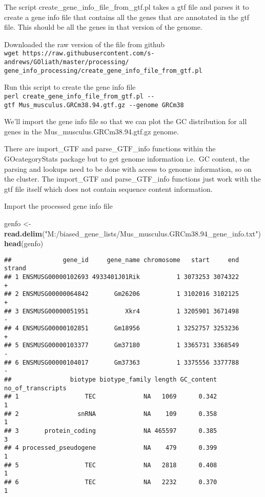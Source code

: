 \documentclass[]{article}
\newenvironment{Shaded}{\begin{snugshade}}{\end{snugshade}}
\newcommand{\KeywordTok}[1]{\textcolor[rgb]{0.13,0.29,0.53}{\textbf{#1}}}
\newcommand{\NormalTok}[1]{#1}
\newcommand{\StringTok}[1]{\textcolor[rgb]{0.31,0.60,0.02}{#1}}
\begin{document}
The script create\_gene\_info\_file\_from\_gtf.pl takes a gtf file and
parses it to create a gene info file that contains all the genes that
are annotated in the gtf file. This should be all the genes in that
version of the genome.

Downloaded the raw version of the file from github
\texttt{wget\ https://raw.githubusercontent.com/s-andrews/GOliath/master/processing/}
\texttt{gene\_info\_processing/create\_gene\_info\_file\_from\_gtf.pl}

Run this script to create the gene info file
\texttt{perl\ create\_gene\_info\_file\_from\_gtf.pl\ -\/-gtf\ Mus\_musculus.GRCm38.94.gtf.gz\ -\/-genome\ GRCm38}

We'll import the gene info file so that we can plot the GC distribution
for all genes in the Mus\_musculus.GRCm38.94.gtf.gz genome.

There are import\_GTF and parse\_GTF\_info functions within the
GOcategoryStats package but to get genome information i.e.~GC content,
the parsing and lookups need to be done with access to genome
information, so on the cluster. The import\_GTF and parse\_GTF\_info
functions just work with the gtf file itself which does not contain
sequence content information.

Import the processed gene info file

\begin{Shaded}
\begin{Highlighting}[]
\NormalTok{genfo <-}\StringTok{ }\KeywordTok{read.delim}\NormalTok{(}\StringTok{"M:/biased_gene_lists/Mus_musculus.GRCm38.94_gene_info.txt"}\NormalTok{)}
\KeywordTok{head}\NormalTok{(genfo)}
\end{Highlighting}
\end{Shaded}

\begin{verbatim}
##              gene_id     gene_name chromosome   start     end strand
## 1 ENSMUSG00000102693 4933401J01Rik          1 3073253 3074322      +
## 2 ENSMUSG00000064842       Gm26206          1 3102016 3102125      +
## 3 ENSMUSG00000051951          Xkr4          1 3205901 3671498      -
## 4 ENSMUSG00000102851       Gm18956          1 3252757 3253236      +
## 5 ENSMUSG00000103377       Gm37180          1 3365731 3368549      -
## 6 ENSMUSG00000104017       Gm37363          1 3375556 3377788      -
##                biotype biotype_family length GC_content no_of_transcripts
## 1                  TEC             NA   1069      0.342                 1
## 2                snRNA             NA    109      0.358                 1
## 3       protein_coding             NA 465597      0.385                 3
## 4 processed_pseudogene             NA    479      0.399                 1
## 5                  TEC             NA   2818      0.408                 1
## 6                  TEC             NA   2232      0.370                 1
\end{verbatim}
\end{document}
